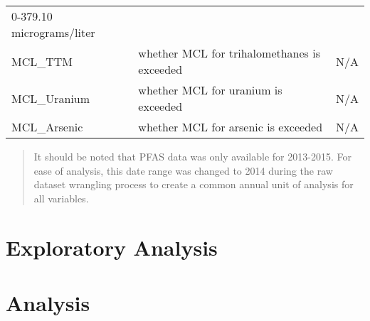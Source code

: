 \documentclass[12pt,]{article}
\begin{document}
\begin{longtable}[]{@{}lll@{}}
\begin{minipage}[t]{0.23\columnwidth}
0-379.10 micrograms/liter\strut
\end{minipage}\tabularnewline
\begin{minipage}[t]{0.22\columnwidth}\raggedright
MCL\_TTM\strut
\end{minipage} & \begin{minipage}[t]{0.46\columnwidth}\raggedright
whether MCL for trihalomethanes is exceeded\strut
\end{minipage} & \begin{minipage}[t]{0.23\columnwidth}\raggedright
N/A\strut
\end{minipage}\tabularnewline
\begin{minipage}[t]{0.22\columnwidth}\raggedright
MCL\_Uranium\strut
\end{minipage} & \begin{minipage}[t]{0.46\columnwidth}\raggedright
whether MCL for uranium is exceeded\strut
\end{minipage} & \begin{minipage}[t]{0.23\columnwidth}\raggedright
N/A\strut
\end{minipage}\tabularnewline
\begin{minipage}[t]{0.22\columnwidth}\raggedright
MCL\_Arsenic\strut
\end{minipage} & \begin{minipage}[t]{0.46\columnwidth}\raggedright
whether MCL for arsenic is exceeded\strut
\end{minipage} & \begin{minipage}[t]{0.23\columnwidth}\raggedright
N/A\strut
\end{minipage}\tabularnewline
\bottomrule
\end{longtable}

\begin{quote}
It should be noted that PFAS data was only available for 2013-2015. For
ease of analysis, this date range was changed to 2014 during the raw
dataset wrangling process to create a common annual unit of analysis for
all variables.
\end{quote}

\newpage

\hypertarget{exploratory-analysis}{%
\section{Exploratory Analysis}\label{exploratory-analysis}}

\newpage

\hypertarget{analysis}{%
\section{Analysis}\label{analysis}}
\end{document}
